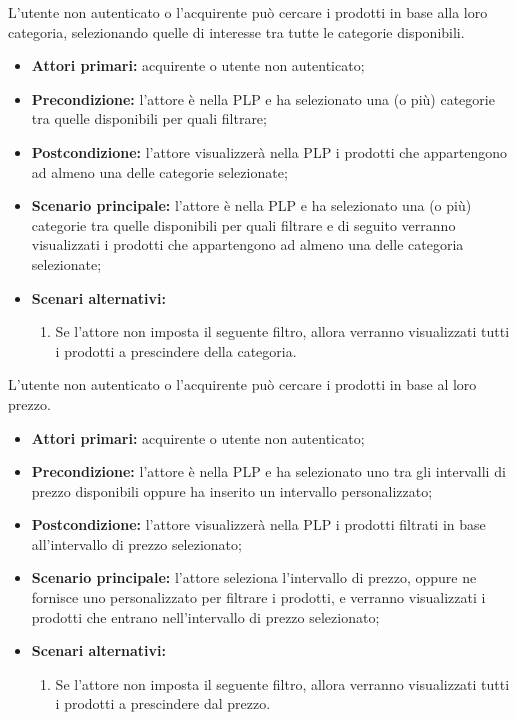 L'utente non autenticato o l'acquirente può cercare i prodotti in base alla loro categoria, selezionando quelle di interesse tra tutte le categorie disponibili.
\begin{itemize}
    \item \textbf{Attori primari:} acquirente o utente non autenticato;
    \item \textbf{Precondizione:} l'attore è nella PLP e ha selezionato una (o più) categorie tra quelle disponibili per quali filtrare;
    \item \textbf{Postcondizione:} l'attore visualizzerà nella PLP i prodotti che appartengono ad almeno una delle categorie selezionate;
    \item \textbf{Scenario principale:} l'attore è nella PLP e ha selezionato una (o più) categorie tra quelle disponibili per quali filtrare e di seguito verranno visualizzati i prodotti che appartengono ad almeno una delle categoria selezionate;
    \item \textbf{Scenari alternativi:}
    \begin{enumerate}[label=\lett]
        \item Se l'attore non imposta il seguente filtro, allora verranno visualizzati tutti i prodotti a prescindere della categoria.
    \end{enumerate}
\end{itemize}

\label{filtro-prodotti-acquirente.prezzo}

L'utente non autenticato o l'acquirente può cercare i prodotti in base al loro prezzo.
\begin{itemize}
    \item \textbf{Attori primari:} acquirente o utente non autenticato;
    \item \textbf{Precondizione:} l'attore è nella PLP e ha selezionato uno tra gli intervalli di prezzo disponibili oppure ha inserito un intervallo personalizzato;
    \item \textbf{Postcondizione:} l'attore visualizzerà nella PLP i prodotti filtrati in base all'intervallo di prezzo selezionato;
    \item \textbf{Scenario principale:} l'attore seleziona l'intervallo di prezzo, oppure ne fornisce uno personalizzato per filtrare i prodotti, e verranno visualizzati i prodotti che entrano nell'intervallo di prezzo selezionato;
    \item \textbf{Scenari alternativi:}
    \begin{enumerate}[label=\lett]
        \item Se l'attore non imposta il seguente filtro, allora verranno visualizzati tutti i prodotti a prescindere dal prezzo.
    \end{enumerate}
\end{itemize}

